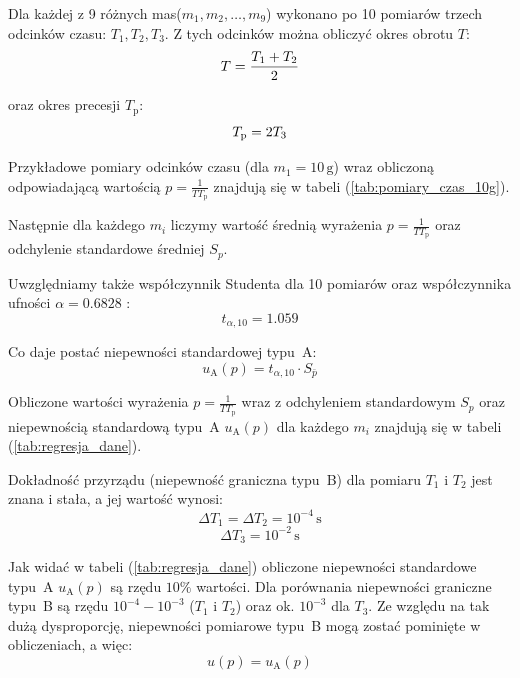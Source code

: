 \documentclass[twocolumn, a4paper, polish, 10pt]{article}
\begin{document}
Dla każdej z 9 różnych mas($m_1, m_2, \dots, m_9$) wykonano po 10 pomiarów trzech odcinków czasu: $T_1, T_2, T_3$. Z tych odcinków można obliczyć okres obrotu $T$:
\begin{displaymath}
    T = \frac{T_1 + T_2}{2} \\
\end{displaymath}

oraz okres precesji $T_{\mathrm{p}}$:
\begin{displaymath}
    T_{\mathrm{p}} = 2 T_3 \\
\end{displaymath}

Przykładowe pomiary odcinków czasu (dla $m_1 = 10 \, \mathrm{g}$) wraz obliczoną odpowiadającą wartością $p = \frac{1}{T T_{\mathrm{p}}}$ znajdują się w tabeli (\ref{tab:pomiary_czas_10g}).



Następnie dla każdego $m_i$ liczymy wartość średnią wyrażenia $p = \frac{1}{T T_{\mathrm{p}}}$ oraz odchylenie standardowe średniej $S_p$.

Uwzględniamy także współczynnik Studenta dla 10 pomiarów oraz współczynnika ufności $\alpha=0.6828$ \cite{smop_wyklad}:
\begin{displaymath}
    t_{\alpha, 10} = 1.059
\end{displaymath}

Co daje postać niepewności standardowej typu~A:
\begin{displaymath}
    u_{\mathrm{A}}(p) = t_{\alpha, 10} \cdot S_{\bar{p}}
\end{displaymath}

Obliczone wartości wyrażenia $p = \frac{1}{T T_{\mathrm{p}}}$ wraz z odchyleniem standardowym $S_p$ oraz niepewnością standardową typu~A $u_{\mathrm{A}}(p)$ dla każdego $m_i$ znajdują się w tabeli (\ref{tab:regresja_dane}).



Dokładność przyrządu (niepewność graniczna typu~B) dla pomiaru $T_1$ i $T_2$ jest znana i stała, a jej wartość wynosi:
\begin{displaymath}
    \Delta T_1 = \Delta T_2 = 10^{-4} \, \mathrm{s}
\end{displaymath}
\begin{displaymath}
    \Delta T_3 = 10^{-2} \, \mathrm{s}
\end{displaymath}

Jak widać w tabeli (\ref{tab:regresja_dane}) obliczone niepewności standardowe typu~A $u_{\mathrm{A}}(p)$ są rzędu $10 \%$ wartości. Dla porównania niepewności graniczne typu~B są rzędu $10^{-4} - 10^{-3}$ ($T_1$ i $T_2$) oraz ok. $10^{-3}$ dla $T_3$. Ze względu na tak dużą dysproporcję, niepewności pomiarowe typu~B mogą zostać pominięte w obliczeniach, a więc:
\begin{displaymath}
    u(p) = u_{\mathrm{A}}(p)
\end{displaymath}
\end{document}
